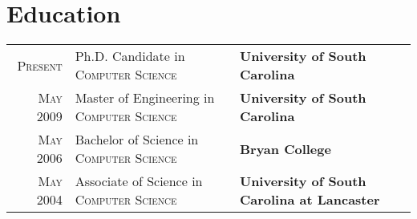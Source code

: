 \documentclass[a4paper,10pt]{article}
\begin{document}
\section{Education}
\begin{tabular}{r p{6.5cm} p{7cm}}	
  \textsc{Present} & Ph.D. Candidate in \textsc{Computer Science} & \textbf{University of South Carolina}\\
  \textsc{May} 2009 & Master of Engineering in \textsc{Computer Science} & \textbf{University of South Carolina}\\
  \textsc{May} 2006& Bachelor of Science in \textsc{Computer Science} & \textbf{Bryan College} \\
\textsc{May} 2004& Associate of Science in \textsc{Computer Science} & \textbf{University of South Carolina at Lancaster} \\
\end{tabular}
\end{document}
